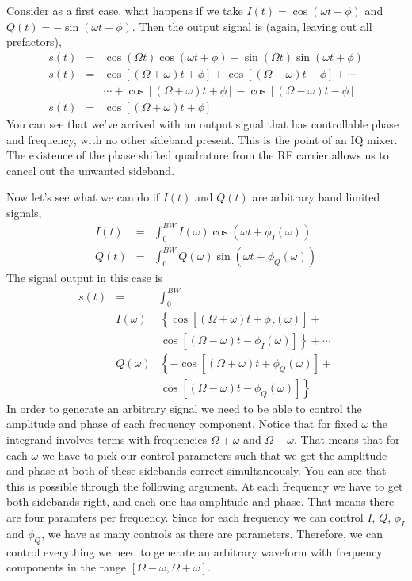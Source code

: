 \documentclass{article}
\begin{document}
Consider as a first case, what happens if we take $I(t)=\cos(\omega t+\phi)$
and $Q(t)=-\sin(\omega t+\phi)$. Then the output signal is (again,
leaving out all prefactors),\begin{eqnarray*}
s(t) & = & \cos(\Omega t)\cos(\omega t+\phi)-\sin(\Omega t)\sin(\omega t+\phi)\\
s(t) & = & \cos\left[\left(\Omega+\omega\right)t+\phi\right]+\cos\left[\left(\Omega-\omega\right)t-\phi\right]+\cdots\\
 &  & \cdots+\cos\left[\left(\Omega+\omega\right)t+\phi\right]-\cos\left[\left(\Omega-\omega\right)t-\phi\right]\\
s(t) & = & \cos\left[\left(\Omega+\omega\right)t+\phi\right]\end{eqnarray*}
 You can see that we've arrived with an output signal that has controllable
phase and frequency, with no other sideband present. This is the point
of an IQ mixer. The existence of the phase shifted quadrature from
the RF carrier allows us to cancel out the unwanted sideband.

Now let's see what we can do if $I(t)$ and $Q(t)$ are arbitrary
band limited signals,\begin{eqnarray*}
I(t) & = & \int_{0}^{BW}I(\omega)\cos\left(\omega t+\phi_{I}(\omega)\right)\\
Q(t) & = & \int_{0}^{BW}Q(\omega)\sin\left(\omega t+\phi_{Q}(\omega)\right)\end{eqnarray*}
 The signal output in this case is\begin{eqnarray*}
s(t) & = & \int_{0}^{BW}\\
 & I(\omega) & \left\{ \cos\left[\left(\Omega+\omega\right)t+\phi_{I}(\omega)\right]+\right.\\
 &  & \left.\cos\left[\left(\Omega-\omega\right)t-\phi_{I}(\omega)\right]\right\} +\cdots\\
 & Q(\omega) & \left\{ -\cos\left[\left(\Omega+\omega\right)t+\phi_{Q}(\omega)\right]+\right.\\
 &  & \left.\cos\left[\left(\Omega-\omega\right)t-\phi_{Q}(\omega)\right]\right\} \end{eqnarray*}
 In order to generate an arbitrary signal we need to be able to control
the amplitude and phase of each frequency component. Notice that for
fixed $\omega$ the integrand involves terms with frequencies $\Omega+\omega$
and $\Omega-\omega$. That means that for each $\omega$ we have to
pick our control parameters such that we get the amplitude and phase
at both of these sidebands correct simultaneously. You can see that
this is possible through the following argument. At each frequency
we have to get both sidebands right, and each one has amplitude and
phase. That means there are four paramters per frequency. Since for
each frequency we can control $I$, $Q$, $\phi_{I}$ and $\phi_{Q}$,
we have as many controls as there are parameters. Therefore, we can
control everything we need to generate an arbitrary waveform with
frequency components in the range $\left[\Omega-\omega,\Omega+\omega\right]$.
\end{document}
